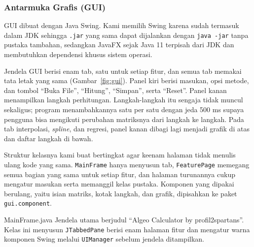 \subsubsection{Antarmuka Grafis (GUI)}

GUI dibuat dengan Java Swing. Kami memilih Swing karena sudah termasuk dalam JDK sehingga \texttt{.jar} yang sama dapat dijalankan dengan \texttt{java -jar} tanpa pustaka tambahan, sedangkan JavaFX sejak Java 11 terpisah dari JDK dan membutuhkan dependensi khusus sistem operasi.

Jendela GUI berisi enam tab, satu untuk setiap fitur, dan semua tab memakai tata letak yang sama (Gambar~\ref{fig:gui}). Panel kiri berisi masukan, opsi metode, dan tombol ``Buka File'', ``Hitung'', ``Simpan'', serta ``Reset''. Panel kanan menampilkan langkah perhitungan. Langkah-langkah itu sengaja tidak muncul sekaligus; program menambahkannya satu per satu dengan jeda 500 ms supaya pengguna bisa mengikuti perubahan matriksnya dari langkah ke langkah. Pada tab interpolasi, \textit{spline}, dan regresi, panel kanan dibagi lagi menjadi grafik di atas dan daftar langkah di bawah.

Struktur kelasnya kami buat bertingkat agar keenam halaman tidak menulis ulang kode yang sama. \texttt{MainFrame} hanya menyusun tab, \texttt{FeaturePage} memegang semua bagian yang sama untuk setiap fitur, dan halaman turunannya cukup mengatur masukan serta memanggil kelas pustaka. Komponen yang dipakai berulang, yaitu isian matriks, kotak langkah, dan grafik, dipisahkan ke paket \texttt{gui.component}.

\begin{kelas}{MainFrame.java}
Jendela utama berjudul ``Algeo Calculator by profil2spartans''. Kelas ini menyusun \texttt{JTabbedPane} berisi enam halaman fitur dan mengatur warna komponen Swing melalui \texttt{UIManager} sebelum jendela ditampilkan.
 
 
\end{kelas}

